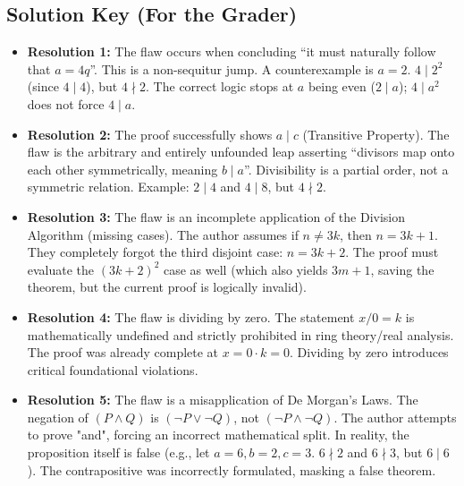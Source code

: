 \documentclass[11pt]{article}
\theoremstyle{definition}
\theoremstyle{remark}
\begin{document}
\newpage
\subsection{Solution Key (For the Grader)}
\begin{itemize}
    \item \textbf{Resolution 1:} The flaw occurs when concluding ``it must naturally follow that $a = 4q$''. This is a non-sequitur jump. A counterexample is $a = 2$. $4 \mid 2^2$ (since $4 \mid 4$), but $4 \nmid 2$. The correct logic stops at $a$ being even ($2 \mid a$); $4 \mid a^2$ does not force $4 \mid a$.
    \item \textbf{Resolution 2:} The proof successfully shows $a \mid c$ (Transitive Property). The flaw is the arbitrary and entirely unfounded leap asserting ``divisors map onto each other symmetrically, meaning $b \mid a$''. Divisibility is a partial order, not a symmetric relation. Example: $2 \mid 4$ and $4 \mid 8$, but $4 \nmid 2$. 
    \item \textbf{Resolution 3:} The flaw is an incomplete application of the Division Algorithm (missing cases). The author assumes if $n \neq 3k$, then $n = 3k+1$. They completely forgot the third disjoint case: $n = 3k+2$. The proof must evaluate the $(3k+2)^2$ case as well (which also yields $3m+1$, saving the theorem, but the current proof is logically invalid).
    \item \textbf{Resolution 4:} The flaw is dividing by zero. The statement $x/0 = k$ is mathematically undefined and strictly prohibited in ring theory/real analysis. The proof was already complete at $x = 0 \cdot k = 0$. Dividing by zero introduces critical foundational violations.
    \item \textbf{Resolution 5:} The flaw is a misapplication of De Morgan's Laws. The negation of $(P \land Q)$ is $(\neg P \lor \neg Q)$, not $(\neg P \land \neg Q)$. The author attempts to prove "and", forcing an incorrect mathematical split. In reality, the proposition itself is false (e.g., let $a=6, b=2, c=3$. $6 \nmid 2$ and $6 \nmid 3$, but $6 \mid 6$). The contrapositive was incorrectly formulated, masking a false theorem.
\end{itemize}
\end{document}
